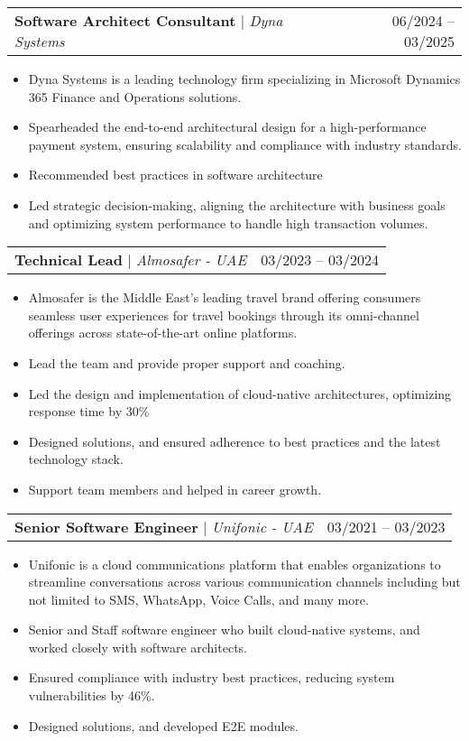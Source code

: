 \documentclass[letterpaper,11pt]{article}
\makeatletter
\newcommand{\resumeItem}[1]{
  \item\small{
    {#1 \vspace{-2pt}}
  }
}
\newcommand{\resumeProjectHeading}[2]{
    \item
    \begin{tabular*}{0.97\textwidth}{l@{\extracolsep{\fill}}r}
      \small#1 & #2 \\
    \end{tabular*}\vspace{-7pt}
}
\newcommand{\resumeItemListStart}{\begin{itemize}}
\newcommand{\resumeItemListEnd}{\end{itemize}\vspace{-5pt}}
\makeatother
\begin{document}
          \resumeProjectHeading
    		  {\textbf{Software Architect Consultant} $|$ \footnotesize\emph{Dyna Systems}\vspace{4pt}}{06/2024 -- 03/2025}
    		  \resumeItemListStart
        		\resumeItem {Dyna Systems is a leading technology firm specializing in Microsoft Dynamics 365 Finance and Operations solutions.}
        		\resumeItem {Spearheaded the end-to-end architectural design for a high-performance payment system, ensuring scalability and compliance with industry standards.}
        		\resumeItem {Recommended best practices in software architecture}
        	    \resumeItem {Led strategic decision-making, aligning the architecture with business goals and optimizing system performance to handle high transaction volumes.}
    		 \resumeItemListEnd

          \resumeProjectHeading
	          {\textbf{Technical Lead} $|$ \footnotesize\emph{Almosafer - UAE}\vspace{4pt}}{03/2023 -- 03/2024}
			\resumeItemListStart		  
          			\resumeItem {Almosafer is the Middle East’s leading travel brand offering consumers seamless user experiences for travel bookings through its omni-channel offerings across state-of-the-art online platforms.} 
          			\resumeItem {Lead the team and provide proper support and coaching.}
          			\resumeItem {Led the design and implementation of cloud-native architectures, optimizing response time by 30\%}
          			\resumeItem {Designed solutions, and ensured adherence to best practices and the latest technology stack.}
          			\resumeItem {Support team members and helped in career growth.}
          \resumeItemListEnd 

		 \resumeProjectHeading
          {\textbf{Senior Software Engineer}\vspace{4pt} $|$ \footnotesize\emph{Unifonic - UAE}}{03/2021 -- 03/2023}
		 \resumeItemListStart
 		  	\resumeItem	 {Unifonic is a cloud communications platform that enables organizations to streamline conversations across various communication channels including but not limited to SMS, WhatsApp, Voice Calls, and many more.}         
          	\resumeItem {Senior and Staff software engineer who built cloud-native systems, and worked closely with software architects.}
          	\resumeItem {Ensured compliance with industry best practices, reducing system vulnerabilities by 46\%.}
          	\resumeItem {Designed solutions, and developed E2E modules.}
        \resumeItemListEnd 
         
\end{document}

